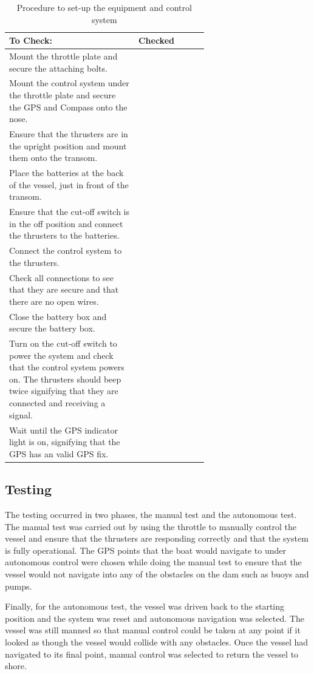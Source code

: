  \begin{table}
 	\begin{center}
 		\caption{Procedure to set-up the equipment and control system}
 		\label{tab:4:equipCheck}
 		\begin{tabular}{|p{0.65\linewidth}|l|}
			\hline
 			To Check: & Checked \\
 			\hline
 			Mount the throttle plate and secure the attaching bolts.&\\
 			\hline
 			Mount the control system under the throttle plate and secure the GPS and Compass onto the nose.&\\
 			\hline
 			Ensure that the thrusters are in the upright position and mount them onto the transom.&\\
 			\hline
 			Place the batteries at the back of the vessel, just in front of the transom.&\\
 			\hline
 			Ensure that the cut-off switch is in the off position and connect the thrusters to the batteries.&\\
 			\hline
 			Connect the control system to the thrusters. &\\
 			\hline
 			Check all connections to see that they are secure and that there are no open wires. &\\
 			\hline
 			Close the battery box and secure the battery box. &\\
 			\hline
 			Turn on the cut-off switch to power the system and check that the control system powers on. The thrusters should beep twice signifying that they are connected and receiving a signal.&\\
 			\hline
 			Wait until the GPS indicator light is on, signifying that the GPS has an valid GPS fix. &\\
 			\hline
 		\end{tabular}
 	\end{center}
 \end{table}
\subsection{Testing}
The testing occurred in two phases, the manual test and the autonomous test. The manual test was carried out by using the throttle to manually control the vessel and ensure that the thrusters are responding correctly and that the system is fully operational. The GPS points that the boat would navigate to under autonomous control were chosen while doing the manual test to ensure that the vessel would not navigate into any of the obstacles on the dam such as buoys and pumps.\par
Finally, for the autonomous test, the vessel was driven back to the starting position and the system was reset and autonomous navigation was selected. The vessel was still manned so that manual control could be taken at any point if it looked as though the vessel would collide with any obstacles. Once the vessel had navigated to its final point, manual control was selected to return the vessel to shore. 
